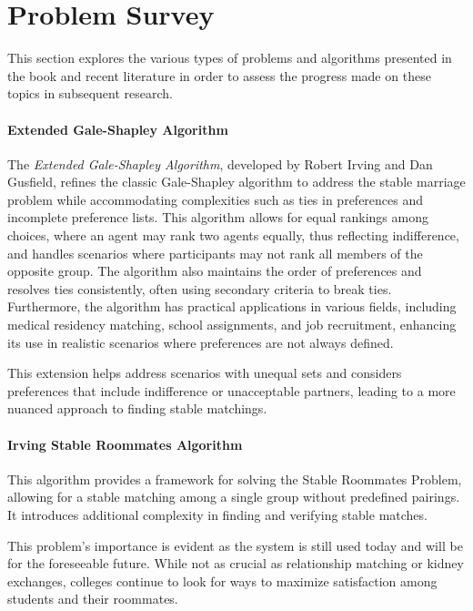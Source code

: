 \section*{Problem Survey}
This section explores the various types of problems and algorithms presented in the book and recent literature in order to assess the progress made on these topics in subsequent research.

\paragraph{Extended Gale-Shapley Algorithm}

The \emph{Extended Gale-Shapley Algorithm}, developed by Robert Irving and Dan Gusfield, refines the classic Gale-Shapley algorithm to address the stable marriage problem while accommodating complexities such as ties in preferences and incomplete preference lists. This algorithm allows for equal rankings among choices, where an agent may rank two agents equally, thus reflecting indifference, and handles scenarios where participants may not rank all members of the opposite group. The algorithm also maintains the order of preferences and resolves ties consistently, often using secondary criteria to break ties. Furthermore, the algorithm has practical applications in various fields, including medical residency matching, school assignments, and job recruitment, enhancing its use in realistic scenarios where preferences are not always defined.

This extension helps address scenarios with unequal sets and considers preferences that include indifference or unacceptable partners, leading to a more nuanced approach to finding stable matchings. \cite{gusfield}

\paragraph{Irving Stable Roommates Algorithm}
This algorithm provides a framework for solving the Stable Roommates Problem, allowing for a stable matching among a single group without predefined pairings. It introduces additional complexity in finding and verifying stable matches.
\cite{gusfield}

This problem's importance is evident as the system is still used today and will be for the foreseeable future. While not as crucial as relationship matching or kidney exchanges, colleges continue to look for ways to maximize satisfaction among students and their roommates.

